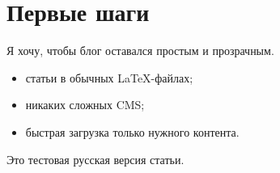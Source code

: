 \section{Первые шаги}

Я хочу, чтобы блог оставался простым и прозрачным.

\begin{itemize}
\item статьи в обычных LaTeX-файлах;
\item никаких сложных CMS;
\item быстрая загрузка только нужного контента.
\end{itemize}

Это тестовая русская версия статьи.
